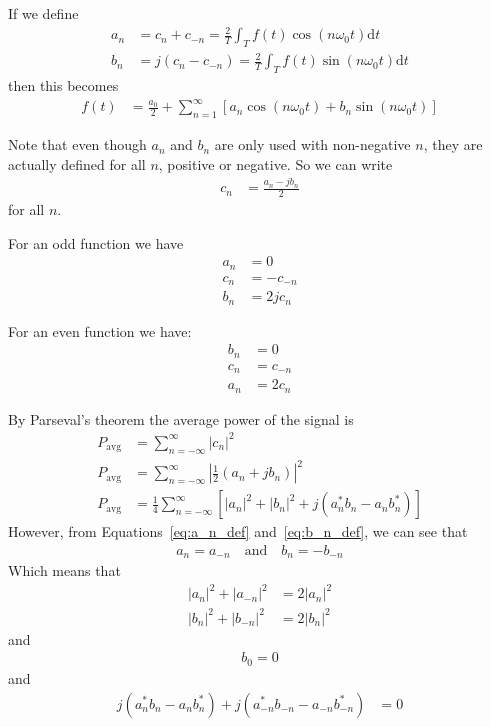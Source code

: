 \documentclass[twocolumn]{myarticle}
\renewcommand{\d}{\mathrm{d}}
\begin{document}
If we define
\begin{align}
    a_n &= c_n + c_{-n} = \frac{2}{T} \int_{T} f(t) \cos(n \omega_0 t) \d t \label{eq:a_n_def}
    \\
    b_n &= j(c_n - c_{-n}) = \frac{2}{T} \int_{T} f(t) \sin(n \omega_0 t) \d t \label{eq:b_n_def}
\end{align}
then this becomes
\begin{align}
    f(t) &= \frac{a_0}{2} + \sum_{n = 1}^{\infty} \left[ a_n \cos (n \omega_0 t) + b_n \sin (n \omega_0 t) \right]
\end{align}

Note that even though $ a_n $ and $ b_n $ are only used with non-negative $ n $, they are actually defined for all $ n $, positive or negative.
So we can write
\begin{align}
    c_n &= \frac{a_n - j b_n}{2}
\end{align}
for all $ n $.

For an odd function we have
\begin{align}
    a_n &= 0
    \\
    c_n &= - c_{-n}
    \\
    b_n &= 2 j c_n
\end{align}

For an even function we have:
\begin{align}
    b_n &= 0
    \\
    c_n &= c_{-n}
    \\
    a_n &= 2 c_n
\end{align}

By Parseval's theorem the average power of the signal is
\begin{align}
    P_\text{avg} &= \sum_{n = -\infty}^{\infty} \left| c_n \right|^2 
    \\
    P_\text{avg} &= \sum_{n = -\infty}^{\infty} \left| \frac{1}{2} \left( a_n + j b_n \right) \right|^2
    \\
    P_\text{avg} &= \frac{1}{4} \sum_{n = -\infty}^{\infty} \left[ \left| a_n \right|^2 + \left| b_n \right|^2 + j \left( a_n^* b_n - a_n b_n^* \right) \right]
    \label{eq:parseval_1}
\end{align}
However, from Equations~\ref{eq:a_n_def} and~\ref{eq:b_n_def}, we can see that
\begin{align}
    a_n = a_{-n} \quad \text{and} \quad b_n = -b_{-n}
\end{align}
Which means that
\begin{align}
    \left| a_n \right|^2 + \left| a_{-n} \right|^2 &= 2 \left| a_n \right|^2
    \\
    \left| b_n \right|^2 + \left| b_{-n} \right|^2 &= 2 \left| b_n \right|^2
\end{align}
and
\begin{align}
    b_0 = 0
\end{align}
and
\begin{align}
    j \left( a_n^* b_n - a_n b_n^* \right) + j \left( a_{-n}^* b_{-n} - a_{-n} b_{-n}^* \right) &= 0
\end{align}
\end{document}
